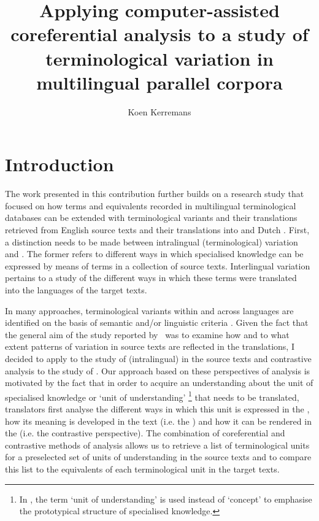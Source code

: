 \documentclass[output=paper]{langsci/langscibook.cls}
\author{Koen Kerremans \affiliation{Vrije Universiteit Brussel}}
\title{Applying computer-assisted coreferential analysis to a study of 
	terminological variation in multilingual parallel corpora}
\begin{document}
\section{Introduction}\label{sec:intro}
\largerpage
The work presented in this contribution further builds on a research study that 
focused on how terms and equivalents recorded in multilingual terminological databases 
can be extended with terminological variants and their translations retrieved from 
English source texts and their translations into  and Dutch \citep{Kerremans2012}. 
First, a distinction needs to be made between intralingual (terminological) variation 
and . The former refers to different ways in which specialised 
knowledge can be expressed by means of terms in a collection of source texts. Interlingual 
variation pertains to a study of the different ways in which these  
terms were translated into the languages of the target texts.

In many  approaches, terminological variants within and across languages are identified on the basis of semantic and/or linguistic criteria \citep{CarrenoCruz2008,FernandezSilva2010}. Given the fact that the general aim of the study 
reported by~\citet{Kerremans2012} was to examine how and to what extent patterns of variation in source texts are reflected in the translations, I decided to apply 
 to the study of (intralingual)  
in the source texts and contrastive analysis to the study of . 
Our approach based on these perspectives of analysis is motivated by the fact that 
in order to acquire an understanding about the unit of specialised knowledge or 
`unit of understanding' \citep{Temmerman2000}\footnote{ In \citep{Temmerman2000}, the term 
`unit of understanding' is used instead of `concept' to emphasise the prototypical 
structure of specialised knowledge.} that needs to be translated, translators first 
analyse the different ways in which this unit is expressed in the , 
how its meaning is developed in the text (i.e. the ) and how 
it can be rendered in the  (i.e. the contrastive perspective). The 
combination of coreferential and contrastive methods of analysis allows us to retrieve 
a list of terminological units for a preselected set of units of understanding 
in the source texts and to compare this list to the equivalents of each terminological 
unit in the target texts.
\end{document}
